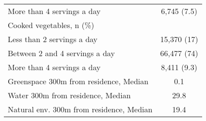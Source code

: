 \begin{tabular}{lc}
\addlinespace
\hspace{1em}More than 4 servings a day & 6,745 (7.5)\\
Cooked vegetables, n (\%) & \\
\hspace{1em}Less than 2 servings a day & 15,370 (17)\\
\hspace{1em}Between 2 and 4 servings a day & 66,477 (74)\\
\hspace{1em}More than 4 servings a day & 8,411 (9.3)\\
\addlinespace
Greenspace 300m from residence, Median & 0.1\\
Water 300m from residence, Median & 29.8\\
Natural env. 300m from residence, Median & 19.4\\
\bottomrule
\end{tabular}